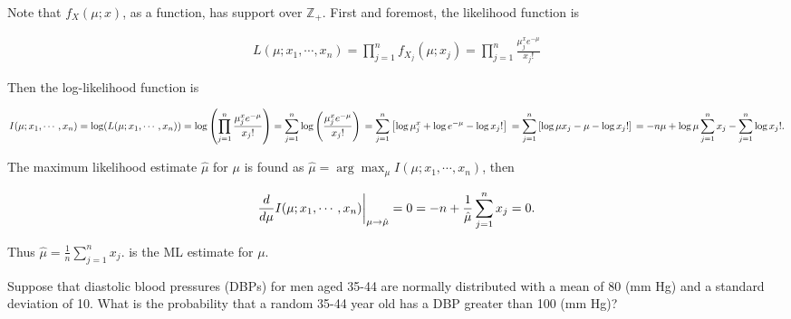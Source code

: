 \documentclass{homework}
\begin{document}
Note that $f_{X}(\mu;x)$, as a function, has support over $\mathds{Z}_{+}$. First and foremost, the likelihood function is 

\begin{align*}
    L(\mu;x_1,\cdots,x_n) = \prod_{j=1}^{n} f_{X_j}(\mu;x_j) = \prod_{j=1}^{n} \frac{\mu^x_j e^{-\mu}}{x_j!} 
\end{align*}

Then the log-likelihood function is 

\begin{dmath*}
    I(\mu;x_1,\cdots,x_n) = \log (L(\mu;x_1,\cdots,x_n) ) = \log \left(\prod_{j=1}^{n} \frac{\mu^x_j e^{-\mu}}{x_j!}\right) 
    = \sum_{j=1}^{n} \log \left(\frac{\mu^x_j e^{-\mu}}{x_j!} \right) \\
    = \sum_{j=1}^{n}  \left[\log \mu^x_j + \log e^{-\mu} - \log x_j! \right] \\
    = \sum_{j=1}^{n}  \left[\log \mu x_j - \mu - \log x_j!\right] \\
    = -n \mu + \log \mu \sum_{j=1}^{n} x_j - \sum_{j=1}^{n} \log x_j!.
\end{dmath*}

The maximum likelihood estimate $\hat{\mu}$ for $\mu$ is found as $\hat{\mu} = \arg \max_{\mu}  I(\mu;x_1,\cdots,x_n)$, then

\begin{dmath*}
    \frac{d}{d\mu}I(\mu;x_1,\cdots,x_n)\bigg|_{\mu\rightarrow\hat{\mu}}=0\\
    = -n + \frac{1}{\hat{\mu}} \sum_{j=1}^{n} x_j = 0.
\end{dmath*}

Thus $\hat{\mu} = \frac{1}{n} \sum_{j=1}^{n} x_j.  $ is the ML estimate for $\mu$. \\

\begin{tcolorbox}[title=Question 7]
Suppose that diastolic blood pressures (DBPs) for men aged 35-44 are normally distributed with a mean of 80 (mm Hg) and a standard deviation of 10. What is the probability that a random 35-44 year old has a  DBP greater than 100 (mm Hg)?
\end{tcolorbox}
\end{document}
